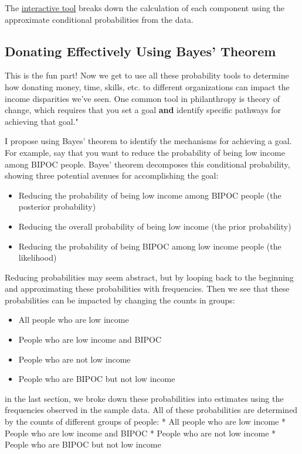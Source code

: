 \documentclass[11pt]{article}
\begin{document}
The \href{https://observablehq.com/@chaya/check-for-your-privilege3}{interactive tool} breaks down the calculation of each component using the approximate conditional probabilities from the data.

\subsection*{Donating Effectively Using Bayes' Theorem}

This is the fun part! Now we get to use all these probability tools to determine how donating money, time, skills, etc. to different organizations can impact the income disparities we've seen. One common tool in philanthropy is theory of change, which requires that you set a goal \textbf{and} identify specific pathways for achieving that goal."\cite{effphil}\cite{theorychange} 

I propose using Bayes' theorem to identify the mechanisms for achieving a goal. For example, say that you want to reduce the probability of being low income among BIPOC people. Bayes' theorem decomposes this conditional probability, showing three potential avenues for accomplishing the goal:
\begin{itemize}
    \item Reducing the probability of being low income among BIPOC people (the posterior probability)
    \item Reducing the overall probability of being low income (the prior probability)
    \item Reducing the probability of being BIPOC among low income people (the likelihood)
\end{itemize}

Reducing probabilities may seem abstract, but by looping back to the beginning and approximating these probabilities with frequencies. Then we see that these probabilities can be impacted by changing the counts in groups:
\begin{itemize}
    \item All people who are low income
    \item People who are low income and BIPOC
    \item People who are not low income
    \item People who are BIPOC but not low income
\end{itemize}
in the last section, we broke down these probabilities into estimates using the frequencies observed in the sample data. All of these probabilities are determined by the counts of different groups of people:
* All people who are low income
* People who are low income and BIPOC
* People who are not low income
* People who are BIPOC but not low income
\end{document}
